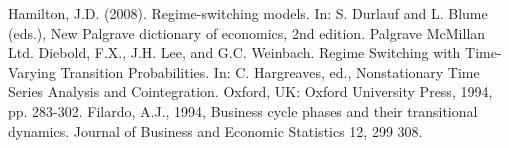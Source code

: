 \documentclass[a4paper]{article}
\begin{document}
\begin{thebibliography}{1}
 Hamilton, J.D. (2008). Regime-switching models. In: S. Durlauf and L. Blume (eds.), New Palgrave dictionary of economics, 2nd edition. Palgrave McMillan Ltd.
 Diebold, F.X., J.H. Lee, and G.C. Weinbach. Regime Switching with Time-Varying Transition Probabilities. In: C. Hargreaves, ed., Nonstationary Time Series Analysis and Cointegration. Oxford, UK: Oxford University Press, 1994, pp. 283-302.
 Filardo, A.J., 1994, Business cycle phases and their transitional dynamics. Journal of Business and Economic Statistics 12, 299 308. 
\end{thebibliography}
\end{document}
